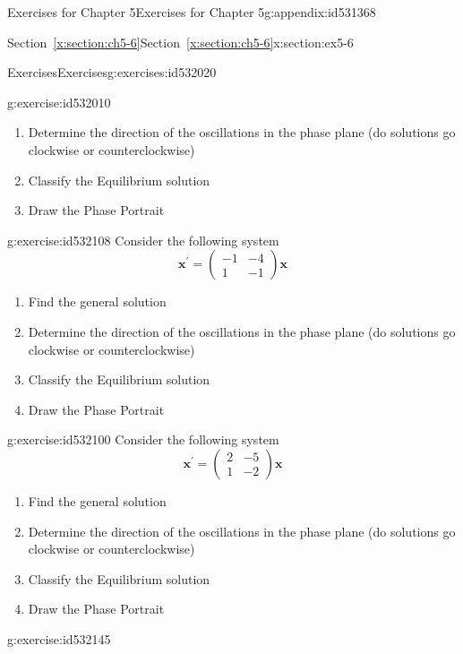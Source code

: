 \documentclass[oneside,10pt,]{book}
\newcommand{\xreffont}{\relax}
\numberwithin{equation}{section}
\numberwithin{equation}{section}
\newcommand{\amp}{&}
\begin{document}
\begin{appendixptx}{Exercises for Chapter 5}{}{Exercises for Chapter 5}{}{}{g:appendix:id531368}
\begin{sectionptx}{Section~{\xreffont\ref*{x:section:ch5-6}}}{}{Section~{\xreffont\ref*{x:section:ch5-6}}}{}{}{x:section:ex5-6}
\begin{exercises-subsection-numberless}{Exercises}{}{Exercises}{}{}{g:exercises:id532020}
\begin{divisionexercise}{1}{}{}{g:exercise:id532010}
\begin{enumerate}[label=(\alph*)]
\item{}Determine the direction of the oscillations in the phase plane (do solutions go clockwise or counterclockwise)%
\item{}Classify the Equilibrium solution%
\item{}Draw the Phase Portrait%
\end{enumerate}
\end{divisionexercise}%
\begin{divisionexercise}{2}{}{}{g:exercise:id532108}%
Consider the following system%
\begin{equation*}
\mathbf{x}^{\prime}=\left(\begin{array}{cc}
-1 \amp -4\\
1 \amp -1
\end{array}\right)\mathbf{x}
\end{equation*}
%
%
\begin{enumerate}[label=(\alph*)]
\item{}Find the general solution%
\item{}Determine the direction of the oscillations in the phase plane (do solutions go clockwise or counterclockwise)%
\item{}Classify the Equilibrium solution%
\item{}Draw the Phase Portrait%
\end{enumerate}
\end{divisionexercise}%
\begin{divisionexercise}{3}{}{}{g:exercise:id532100}%
Consider the following system%
\begin{equation*}
\mathbf{x}^{\prime}=\left(\begin{array}{cc}
2 \amp -5\\
1 \amp -2
\end{array}\right)\mathbf{x}
\end{equation*}
%
%
\begin{enumerate}[label=(\alph*)]
\item{}Find the general solution%
\item{}Determine the direction of the oscillations in the phase plane (do solutions go clockwise or counterclockwise)%
\item{}Classify the Equilibrium solution%
\item{}Draw the Phase Portrait%
\end{enumerate}
\end{divisionexercise}%
\begin{divisionexercise}{4}{}{}{g:exercise:id532145}%

\end{divisionexercise}
\end{exercises-subsection-numberless}
\end{sectionptx}
\end{appendixptx}
\end{document}
